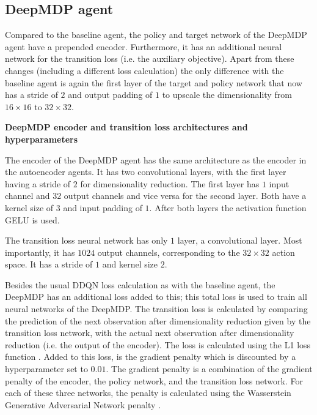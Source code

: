 \subsection{DeepMDP agent}
Compared to the baseline agent, the policy and target network of the DeepMDP agent have a prepended encoder. Furthermore, it has an additional neural network for the transition loss (i.e. the auxiliary objective). Apart from these changes (including a different loss calculation) the only difference with the baseline agent is again the first layer of the target and policy network that now has a stride of $2$ and output padding of $1$ to upscale the dimensionality from $16 \times 16$ to $32 \times 32$.\newline \par

\noindent \textbf{DeepMDP encoder and transition loss architectures and hyperparameters} \par
\noindent The encoder of the DeepMDP agent has the same architecture as the encoder in the autoencoder agents. It has two convolutional layers, with the first layer having a stride of $2$ for dimensionality reduction. The first layer has $1$ input channel and $32$ output channels and vice versa for the second layer. Both have a kernel size of $3$ and input padding of $1$. After both layers the activation function GELU is used.

The transition loss neural network has only $1$ layer, a convolutional layer. Most importantly, it has $1024$ output channels, corresponding to the $32 \times 32$ action space. It has a stride of $1$ and kernel size $2$.

Besides the usual DDQN loss calculation as with the baseline agent, the DeepMDP has an additional loss added to this; this total loss is used to train all neural networks of the DeepMDP. The transition loss is calculated by comparing the prediction of the next observation after dimensionality reduction given by the transition loss network, with the actual next observation after dimensionality reduction (i.e. the output of the encoder). The loss is calculated using the L1 loss function \cite{l1}. Added to this loss, is the gradient penalty which is discounted by a hyperparameter set to $0.01$. The gradient penalty is a combination of the gradient penalty of the encoder, the policy network, and the transition loss network. For each of these three networks, the penalty is calculated using the Wasserstein Generative Adversarial Network penalty \cite{wgan}.

